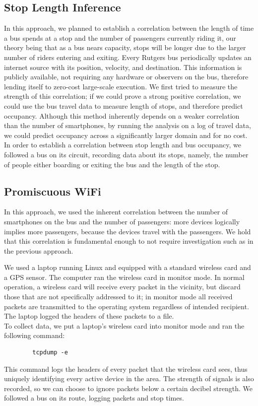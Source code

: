 \documentclass[letterpaper,abstract=on,titlepage=false]{scrreprt}
\begin{document}
	\subsection*{Stop Length Inference}

	In this approach, we planned to establish a correlation between the length of time a bus spends at a stop and the number of passengers currently riding it, our theory being that as a bus nears capacity, stops will be longer due to the larger number of riders entering and exiting.
	Every Rutgers bus periodically updates an internet source with its position, velocity, and destination.
	This information is publicly available, not requiring any hardware or observers on the bus, therefore lending itself to zero-cost large-scale execution.
	We first tried to measure the strength of this correlation; if we could prove a strong positive correlation, we could use the bus travel data to measure length of stops, and therefore predict occupancy.
	Although this method inherently depends on a weaker correlation than the number of smartphones, by running the analysis on a log of travel data, we could predict occupancy across a significantly larger domain and for no cost.
	\\
	In order to establish a correlation between stop length and bus occupancy, we followed a bus on its circuit, recording data about its stops, namely, the number of people either boarding or exiting the bus and the length of the stop.

	\subsection*{Promiscuous WiFi}

	In this approach, we used the inherent correlation between the number of smartphones on the bus and the number of passengers: more devices logically implies more passengers, because the devices travel with the passengers.
	We hold that this correlation is fundamental enough to not require investigation such as in the previous approach.

	We used a laptop running Linux and equipped with a standard wireless card and a GPS sensor.
	The computer ran the wireless card in monitor mode.
	In normal operation, a wireless card will receive every packet in the vicinity, but discard those that are not specifically addressed to it; in monitor mode all received packets are transmitted to the operating system regardless of intended recipient.
	The laptop logged the headers of these packets to a file.
	\\
	To collect data, we put a laptop's wireless card into monitor mode and ran the following command:
	\begin{verbatim}
		tcpdump -e
	\end{verbatim}
	This command logs the headers of every packet that the wireless card sees, thus uniquely identifying every active device in the area.
	The strength of signals is also recorded, so we can choose to ignore packets below a certain decibel strength.
	We followed a bus on its route, logging packets and stop times.
    
\end{document}
